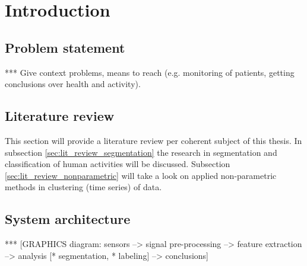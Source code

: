 
\chapter{Introduction} %

\label{Chapter1} %



\section{Problem statement}
*** Give context problems, means to reach (e.g. monitoring of patients,  getting conclusions over health and activity).

\section{Literature review}
This section will provide a literature review per coherent subject of this thesis.
In subsection \ref{sec:lit_review_segmentation} the research in segmentation and classification of human activities will be discussed.
Subsection \ref{sec:lit_review_nonparametric} will take a look on applied non-parametric methods in clustering (time series) of data.









\section{System architecture}

*** [GRAPHICS diagram: sensors --> signal pre-processing --> feature extraction --> analysis [* segmentation, * labeling] --> conclusions]


